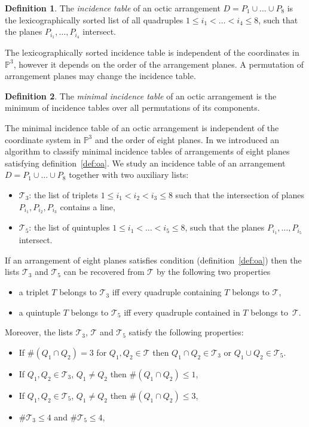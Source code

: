\documentclass[12pt]{amsart}
\theoremstyle{plain}
\theoremstyle{remark}
\theoremstyle{definition}
\newtheorem{defn}{Definition}[section]
\newcommand{\PP}{\mathbb P}
\numberwithin{table}{section}
\begin{document}
\begin{defn}
The \emph{incidence table} of an octic arrangement
$D=P_{1}\cup\dots\cup P_{8}$ is  the lexicographically sorted list of all quadruples $1\le
i_{1}<\dots<i_{4}\le8$, such that the planes
$P_{i_{1}},\dots, P_{i_{4}}$ intersect.
\end{defn}
The lexicographically sorted incidence table is independent of the coordinates in
$\PP^{3}$, however it depends on the order of the arrangement
planes. A permutation of arrangement planes may change the incidence
table.
\begin{defn}
The \emph{minimal incidence table} of an octic arrangement is the
minimum of incidence tables over all permutations of its components.
\end{defn}
The minimal incidence table of an octic arrangement is independent of
the coordinate system in $\PP^{3}$ and the order of eight planes.
In \cite{CK-C} we introduced an algorithm to classify minimal
incidence tables of arrangements of eight planes satisfying
definition~\ref{def:oa}. We study an incidence table of an arrangement
$D=P_{1}\cup\dots\cup P_{8}$ together with two auxiliary lists:
\begin{itemize}
	\item $\mathcal T_{3}$: the  list  of triplets
	\(1\le i_{1}<i_{2}<i_{3}\le8\) such that the intersection of planes
	$P_{i_{1}}, P_{i_{2}}, P_{i_{3}}$ contains a line,
	\item  $\mathcal
	T_{5}$: the list of quintuples $1\le
	i_{1}<\dots<i_{5}\le8$, such that the planes
	$P_{i_{1}},\dots, P_{i_{5}}$ intersect.
\end{itemize}
If an arrangement of eight planes satisfies condition
(definition~\ref{def:oa}) then the lists $\mathcal T_{3}$ and $\mathcal T_{5}$
can be recovered from $\mathcal T$ by the following two properties
\begin{itemize}
  \itemsep=2mm
\item [(L1)] a triplet $T$ belongs to $\mathcal T_{3}$ iff
every quadruple containing $T$ belongs to $\mathcal T$,
\item [(L2)] a quintuple $T$ belongs to $\mathcal T_{5}$ iff every quadruple
  contained in $T$ belongs to~$\mathcal T$.
\end{itemize}
Moreover, the lists $\mathcal T_{3}$, $\mathcal T$ and $\mathcal
T_{5}$ satisfy the following properties:
\begin{itemize}
  \itemsep=2mm
\item [(L3)] If $\#(Q_{1}\cap Q_{2})=3$ for $Q_{1},Q_{2}\in\mathcal T$
then  $Q_{1}\cap Q_{2}\in \mathcal T_{3}$ or $Q_{1}\cup
Q_{2}\in\mathcal T_{5}$.
\item [(L4)] If  $Q_{1},Q_{2}\in\mathcal T_{3}$, $Q_{1}\not=Q_{2}$
  then $\#(Q_{1}\cap Q_{2})\le1$,
\item [(L5)] If  $Q_{1},Q_{2}\in\mathcal T_{5}$, $Q_{1}\not=Q_{2}$
  then $\#(Q_{1}\cap Q_{2})\le3$,
\item [(L6)] $\#\mathcal T_{3}\le 4$ and $\#\mathcal T_{5}\le 4$,
\end{itemize}
\end{document}
